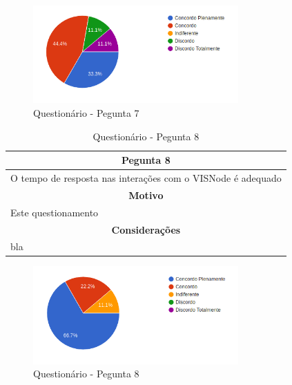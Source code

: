 \documentclass[
	12pt,				%
	oneside,			%
	a4paper,			%
	english,			%
	french,				%
	spanish,			%
	brazil,				%
	]{abntex2}
\begin{document}
\begin{figure}[H]
\centering
\caption{Questionário - Pegunta 7}
\includegraphics[width=0.7\textwidth]{imagens/v1/p7.png}
\sourceAuthor
\end{figure}

\begin{table}[H]
\centering
\caption{Questionário - Pegunta 8} 
\def\arraystretch{1.5}
\begin{tabular}{l}
\hline
\multicolumn{1}{c}{\textbf{Pegunta 8}}              \\ \hline
O tempo de resposta nas interações com o VISNode é adequado \\ \hline
\multicolumn{1}{c}{\textbf{Motivo}}                 \\ \hline
Este questionamento                                   \\ \hline
\multicolumn{1}{c}{\textbf{Considerações}}          \\ \hline
bla                                                   \\ \hline
\end{tabular}
\sourceAuthor
\end{table}

\begin{figure}[H]
\centering
\caption{Questionário - Pegunta 8}
\includegraphics[width=0.7\textwidth]{imagens/v1/p8.png}
\sourceAuthor
\end{figure}
\end{document}
